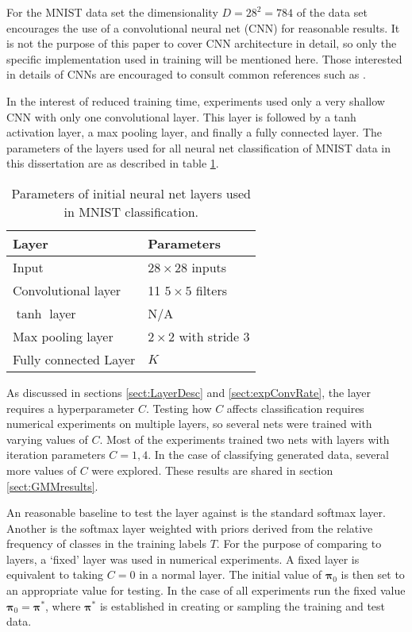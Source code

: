 For the MNIST data set \cite{lecun1998gradient} the dimensionality \( D=28^2=784 \) of the data set encourages the use of a convolutional neural net (CNN) for reasonable results. It is not the purpose of this paper to cover CNN architecture in detail, so only the specific implementation used in training will be mentioned here. Those interested in details of CNNs are encouraged to consult common references such as \cite{lecun2015deep,Schmidhuber_2015,Goodfellow-et-al-2016}. 

In the interest of reduced training time, experiments used only a very shallow CNN with only one convolutional layer. This layer is followed by a tanh activation layer, a max pooling layer, and finally a fully connected layer. The parameters of the layers used for all neural net classification of MNIST data in this dissertation are as described in table \ref{table:MNISTlayers}.

\begin{table}[h]
	\centering
	\begin{tabular}{|m{}|m{}|}
		\toprule
		\textbf{Layer}  & \textbf{Parameters} \\ \midrule
		Input           & $28\times 28$ inputs     \\ \midrule
		Convolutional layer & 11 $5\times 5$ filters  \\ \midrule
		$\tanh$ layer   & N/A   \\ \midrule
		Max pooling layer & $2\times 2$ with stride 3   \\ \midrule
		Fully connected Layer& $K$ \\
		\bottomrule
	\end{tabular}
	\caption[Common convolutional layers for MNIST classification]{Parameters of initial neural net layers used in MNIST classification.}\label{table:MNISTlayers}
\end{table}

As discussed in sections \ref{sect:LayerDesc} and \ref{sect:expConvRate}, the \RS layer requires a hyperparameter \( C \).  Testing how \( C \) affects classification requires numerical experiments on multiple \RS layers, so several nets were trained with varying values of \( C \). Most of the experiments trained two nets with \RS layers with iteration parameters \( C = 1,4 \). In the case of classifying generated data, several more values of \( C \) were explored.  These results are shared in section \ref{sect:GMMresults}.

An reasonable baseline to test the \RS layer against is the standard softmax layer. Another is the softmax layer weighted with priors derived from the relative frequency of classes in the training labels $T$.  For the purpose of comparing to \RS layers, a `fixed' \RS layer was used in numerical experiments.  A fixed \RS layer is equivalent to taking \( C=0 \) in a normal \RS layer. The initial value of \( \bm\pi_0 \) is then set to an appropriate value for testing. In the case of all experiments run the fixed value \( \bm\pi_0 = \bm\pi^{\ast} \), where \( \bm\pi^{\ast} \) is established in creating or sampling the training and test data.


